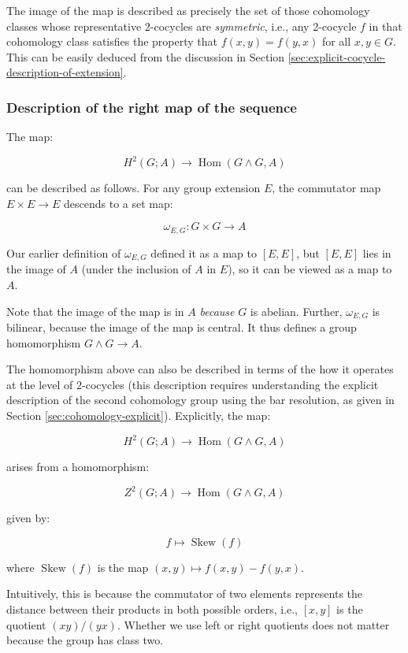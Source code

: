 The image of the map is described as precisely the set of those
cohomology classes whose representative 2-cocycles are {\em
  symmetric}, i.e., any 2-cocycle $f$ in that cohomology class
satisfies the property that $f(x,y) = f(y,x)$ for all $x,y \in
G$. This can be easily deduced from the discussion in Section
\ref{sec:explicit-cocycle-description-of-extension}.

\subsubsection{Description of the right map of the sequence}\label{sec:ses-uct-abelian-right-map}

The map:

$$H^2(G;A) \to \operatorname{Hom}(G \wedge G,A)$$

can be described as follows. For any group extension $E$, the
commutator map $E \times E \to E$ descends to a set map:

$$\omega_{E,G}: G \times G \to A$$

Our earlier definition of $\omega_{E,G}$ defined it as a map to
$[E,E]$, but $[E,E]$ lies in the image of $A$ (under the inclusion of
$A$ in $E$), so it can be viewed as a map to $A$.

Note that the image of the map is in $A$ {\em because} $G$ is
abelian. Further, $\omega_{E,G}$ is bilinear, because the image of the map
is central. It thus defines a group homomorphism $G \wedge G \to A$.

The homomorphism above can also be described in terms of the how it
operates at the level of $2$-cocycles (this description requires
understanding the explicit description of the second cohomology group
using the bar resolution, as given in Section
\ref{sec:cohomology-explicit}). Explicitly, the map:

$$H^2(G;A) \to \operatorname{Hom}(G \wedge G,A)$$

arises from a homomorphism:

$$Z^2(G;A) \to \operatorname{Hom}(G \wedge G,A)$$

given by:

$$f \mapsto \operatorname{Skew}(f)$$

where $\operatorname{Skew}(f)$ is the map $(x,y) \mapsto f(x,y) -
f(y,x)$.

Intuitively, this is because the commutator of two elements represents
the distance between their products in both possible orders, i.e.,
$[x,y]$ is the quotient $(xy)/(yx)$. Whether we use left or right
quotients does not matter because the group has class two.

